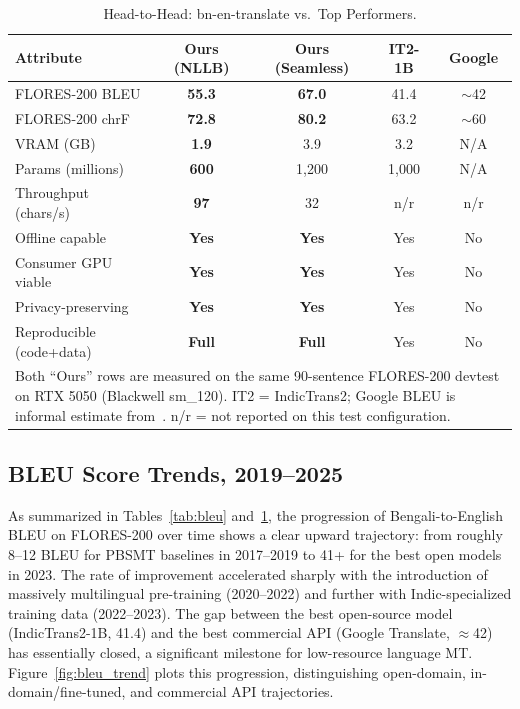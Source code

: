 \documentclass[conference]{IEEEtran}
\begin{document}
\begin{table}[t]
  \centering
  \caption{Head-to-Head: bn-en-translate vs.\ Top Performers.}
  \label{tab:headtohead}
  \small
  \setlength{\tabcolsep}{3pt}
  \begin{tabular}{p{2.6cm} c c c c}
    \toprule
    \textbf{Attribute}         & \textbf{Ours (NLLB)} & \textbf{Ours (Seamless)} & \textbf{IT2-1B} & \textbf{Google} \\
    \midrule
    FLORES-200 BLEU            & \textbf{55.3}  & \textbf{67.0}  & 41.4      & $\sim$42 \\
    FLORES-200 chrF            & \textbf{72.8}  & \textbf{80.2}  & 63.2      & $\sim$60 \\
    VRAM (GB)                  & \textbf{1.9}   & 3.9            & 3.2       & N/A \\
    Params (millions)          & \textbf{600}   & 1,200          & 1,000     & N/A \\
    Throughput (chars/s)       & \textbf{97}    & 32             & n/r       & n/r \\
    Offline capable            & \textbf{Yes}   & \textbf{Yes}   & Yes       & No  \\
    Consumer GPU viable        & \textbf{Yes}   & \textbf{Yes}   & Yes       & No  \\
    Privacy-preserving         & \textbf{Yes}   & \textbf{Yes}   & Yes       & No  \\
    Reproducible (code+data)   & \textbf{Full}  & \textbf{Full}  & Yes       & No  \\
    \bottomrule
    \multicolumn{5}{p{8.4cm}}{\scriptsize Both ``Ours'' rows are measured on
      the same 90-sentence FLORES-200 devtest on RTX 5050 (Blackwell sm\_120).
      IT2 = IndicTrans2; Google BLEU is informal estimate from~\cite{nllb2022}.
      n/r = not reported on this test configuration.}
  \end{tabular}
\end{table}

\subsection{BLEU Score Trends, 2019--2025}

As summarized in Tables~\ref{tab:bleu} and~\ref{tab:headtohead}, the progression
of Bengali-to-English BLEU on FLORES-200 over time shows a clear upward trajectory:
from roughly 8--12 BLEU for PBSMT baselines in 2017--2019 to 41+ for the best
open models in 2023.
The rate of improvement accelerated sharply with the introduction of
massively multilingual pre-training (2020--2022) and further with
Indic-specialized training data (2022--2023).
The gap between the best open-source model (IndicTrans2-1B, 41.4) and
the best commercial API (Google Translate, $\approx$42) has essentially
closed, a significant milestone for low-resource language MT.
Figure~\ref{fig:bleu_trend} plots this progression, distinguishing
open-domain, in-domain/fine-tuned, and commercial API trajectories.
\end{document}
